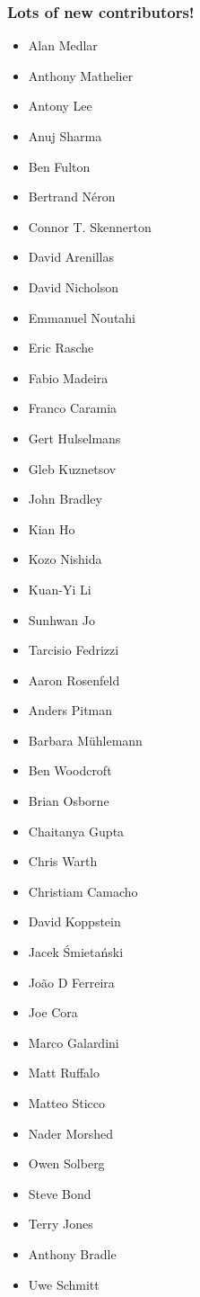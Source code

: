\documentclass[trans]{beamer}
\begin{document}
\frame
{
  \frametitle{Lots of new contributors!}
  
  \scriptsize{
  \begin{multicols}{3}
  \begin{itemize}
  \item Alan Medlar
  \item Anthony Mathelier
  \item Antony Lee
  \item Anuj Sharma
  \item Ben Fulton
  \item Bertrand Néron
  \item Connor T. Skennerton
  \item David Arenillas
  \item David Nicholson
  \item Emmanuel Noutahi
  \item Eric Rasche
  \item Fabio Madeira
  \item Franco Caramia
  \item Gert Hulselmans
  \item Gleb Kuznetsov
  \item John Bradley
  \item Kian Ho
  \item Kozo Nishida
  \item Kuan-Yi Li
  \item Sunhwan Jo
  \item Tarcisio Fedrizzi

  \item Aaron Rosenfeld
  \item Anders Pitman
  \item Barbara Mühlemann
  \item Ben Woodcroft
  \item Brian Osborne
  \item Chaitanya Gupta
  \item Chris Warth
  \item Christiam Camacho
  \item David Koppstein
  \item Jacek Śmietański
  \item João D Ferreira
  \item Joe Cora
  \item Marco Galardini
  \item Matt Ruffalo
  \item Matteo Sticco
  \item Nader Morshed
  \item Owen Solberg
  \item Steve Bond
  \item Terry Jones

  \item Anthony Bradle
  \item Uwe Schmitt
  \end{itemize}
  \end{multicols}
  }
}
\end{document}
